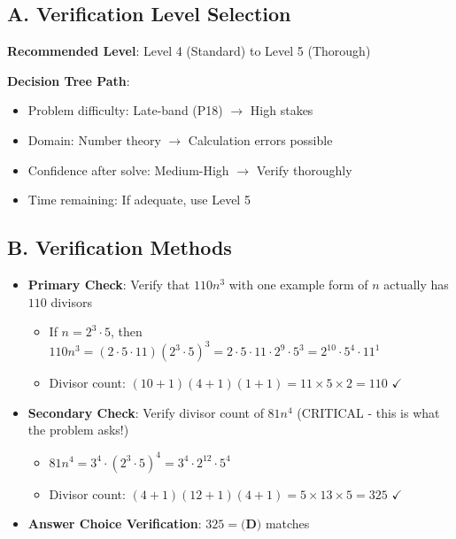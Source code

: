 \documentclass[]{article}
\begin{document}
\begin{verificationbox}
\subsection*{A. Verification Level Selection}

\textbf{Recommended Level}: Level 4 (Standard) to Level 5 (Thorough)

\textbf{Decision Tree Path}:
\begin{itemize}
    \item Problem difficulty: Late-band (P18) $\rightarrow$ High stakes
    \item Domain: Number theory $\rightarrow$ Calculation errors possible
    \item Confidence after solve: Medium-High $\rightarrow$ Verify thoroughly
    \item Time remaining: If adequate, use Level 5
\end{itemize}

\subsection*{B. Verification Methods}
\begin{itemize}[leftmargin=*]
    \item \textbf{Primary Check}: Verify that $110n^3$ with one example form of $n$ actually has $110$ divisors
    \begin{itemize}
        \item If $n = 2^3 \cdot 5$, then $110n^3 = (2 \cdot 5 \cdot 11)(2^3 \cdot 5)^3 = 2 \cdot 5 \cdot 11 \cdot 2^9 \cdot 5^3 = 2^{10} \cdot 5^4 \cdot 11^1$
        \item Divisor count: $(10+1)(4+1)(1+1) = 11 \times 5 \times 2 = 110$ $\checkmark$
    \end{itemize}
    
    \item \textbf{Secondary Check}: Verify divisor count of $81n^4$ (CRITICAL - this is what the problem asks!)
    \begin{itemize}
        \item $81n^4 = 3^4 \cdot (2^3 \cdot 5)^4 = 3^4 \cdot 2^{12} \cdot 5^4$
        \item Divisor count: $(4+1)(12+1)(4+1) = 5 \times 13 \times 5 = 325$ $\checkmark$
    \end{itemize}
    
    \item \textbf{Answer Choice Verification}: $325 = \boxed{\textbf{(D)}}$ matches
    

\end{itemize}
\end{verificationbox}
\end{document}
